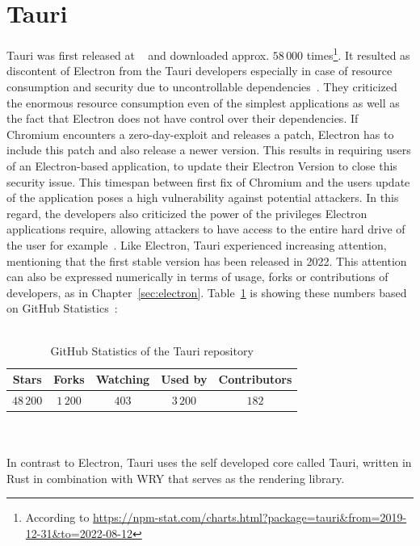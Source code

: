 \section{Tauri}
\label{sec:tauri}
Tauri was first released at ~\cite{tauriRelease} and downloaded approx. $58\,000$ times\footnote{According to \url{https://npm-stat.com/charts.html?package=tauri&from=2019-12-31&to=2022-08-12}}.
It resulted as discontent of Electron from the Tauri developers especially in case of resource consumption and security due to uncontrollable dependencies~\cite{tauri}.
They criticized the enormous resource consumption even of the simplest applications as well as the fact that Electron does not have control over their dependencies.
If Chromium encounters a zero-day-exploit and releases a patch, Electron has to include this patch and also release a newer version.
This results in requiring users of an Electron-based application, to update their Electron Version to close this security issue.
This timespan between first fix of Chromium and the users update of the application poses a high vulnerability against potential attackers.
In this regard, the developers also criticized the power of the privileges Electron applications require, allowing attackers to have access to the entire hard drive of the user for example~\cite{tauri}.
Like Electron, Tauri experienced increasing attention, mentioning that the first stable version has been released in 2022.
This attention can also be expressed numerically in terms of usage, forks or contributions of developers, as in Chapter~\ref{sec:electron}.
Table~\ref{tab:tauri:statistics} is showing these numbers based on GitHub Statistics~\cite{GithubTauri}: \\ \\
\begin{table}[h]
    \begin{tabular} {| c | c | c | c | c |}
        Stars      & Forks     & Watching & Used by    & Contributors \\ \hline
        $48\,200$ & $1\,200$ & $403$ & $3\,200$ & $182$
    \end{tabular}
    \caption{\label{tab:tauri:statistics} GitHub Statistics of the Tauri repository}
\end{table}\\ \\ \newpage
In contrast to Electron, Tauri uses the self developed core called Tauri, written in Rust in combination with \ac{WRY} that serves as the rendering library.


